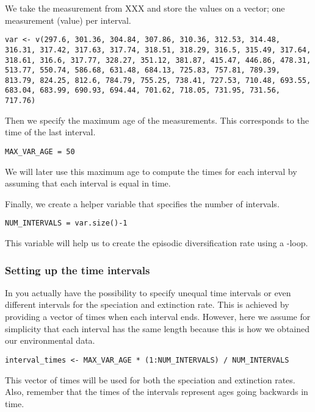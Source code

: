 We take the \COO measurement from {\color{red}XXX} and store the values on a vector; one measurement (value) per interval.
{\tt \begin{snugshade*}
\begin{lstlisting}
var <- v(297.6, 301.36, 304.84, 307.86, 310.36, 312.53, 314.48, 316.31, 317.42, 317.63, 317.74, 318.51, 318.29, 316.5, 315.49, 317.64, 318.61, 316.6, 317.77, 328.27, 351.12, 381.87, 415.47, 446.86, 478.31, 513.77, 550.74, 586.68, 631.48, 684.13, 725.83, 757.81, 789.39, 813.79, 824.25, 812.6, 784.79, 755.25, 738.41, 727.53, 710.48, 693.55, 683.04, 683.99, 690.93, 694.44, 701.62, 718.05, 731.95, 731.56, 717.76)
\end{lstlisting}
\end{snugshade*}}
Then we specify the maximum age of the measurements.
This corresponds to the time of the last interval.
{\tt \begin{snugshade*}
\begin{lstlisting}
MAX_VAR_AGE = 50
\end{lstlisting}
\end{snugshade*}}
We will later use this maximum age to compute the times for each interval by assuming that each interval is equal in time.

Finally, we create a helper variable that specifies the number of intervals.
{\tt \begin{snugshade*}
\begin{lstlisting}
NUM_INTERVALS = var.size()-1
\end{lstlisting}
\end{snugshade*}}
This variable will help us to create the episodic diversification rate using a -loop.

\subsubsection{Setting up the time intervals}
In \RevBayes you actually have the possibility to specify unequal time intervals or even different intervals for the speciation and extinction rate.
This is achieved by providing a vector of times when each interval ends.
However, here we assume for simplicity that each interval has the same length because this is how we obtained our environmental data.
{\tt \begin{snugshade*}
\begin{lstlisting}
interval_times <- MAX_VAR_AGE * (1:NUM_INTERVALS) / NUM_INTERVALS
\end{lstlisting}
\end{snugshade*}}
This vector of times will be used for both the speciation and extinction rates.
Also, remember that the times of the intervals represent ages going backwards in time.


